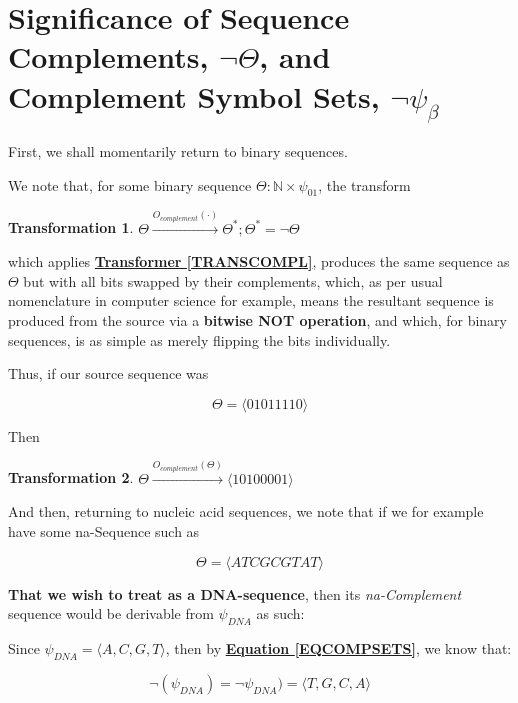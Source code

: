 \documentclass[a4paper, 18pt]{book} %
\newtheorem{trans}{Transformation}
\begin{document}
\section{Significance of Sequence Complements, $\lnot\Theta$, and Complement Symbol Sets, $\lnot\psi_\beta$}
\label{SECSIGCOMPLE}

First, we shall momentarily return to binary sequences. 

We note that, for some binary sequence $\Theta: \mathbb{N} \times \psi_{01}$, the transform

\begin{trans}
$\Theta \xrightarrow{O_{complement}(\cdot)} \Theta^*; \Theta^* = \lnot\Theta$
\end{trans}

which applies \textbf{\hyperref[TRANSCOMPL]{Transformer \ref{TRANSCOMPL}}}, produces the same sequence as $\Theta$ but with all bits swapped by their complements, which, as per usual nomenclature in computer science for example, means the resultant sequence is produced from the source via a \textbf{bitwise NOT operation}, and which, for binary sequences, is as simple as merely flipping the bits individually.

Thus, if our source sequence was 

\begin{equation}
\Theta = \langle 0 1 0 1 1 1 1 0 \rangle
\end{equation}

Then 

\begin{trans}
$\Theta \xrightarrow{O_{complement}(\Theta)}  \langle 1 0 1 0 0 0 0 1 \rangle$
\end{trans}

And then, returning to nucleic acid sequences, we note that if we for example have some na-Sequence such as 

\begin{equation}
\label{SEQATC}
\Theta = \langle A T C G C G T A T \rangle
\end{equation}

\textbf{That we wish to treat as a DNA-sequence}, then its \textit{na-Complement} sequence would be derivable from $\psi_{DNA}$ as such:

Since $\psi_{DNA} = \langle A, C, G, T \rangle$, then by \textbf{\hyperref[EQCOMPSETS]{Equation \ref{EQCOMPSETS}}}, we know that:

\begin{equation}
\lnot(\psi_{DNA}) = \lnot\psi_{DNA}) = \langle T, G, C, A \rangle
\end{equation}
\end{document}
